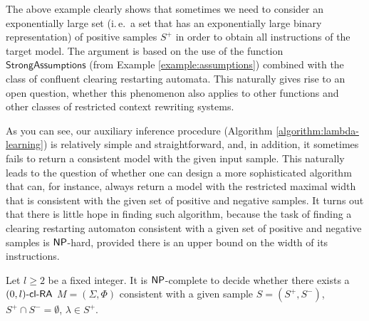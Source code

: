 The above example clearly shows that sometimes we need to consider an exponentially large set (i.\,e.\ a set that has an exponentially large binary representation) of positive samples $S^+$ in order to obtain all instructions of the target model. The argument is based on the use of the function $\mathsf{StrongAssumptions}$ (from Example \ref{example:assumptions}) combined with the class of confluent clearing restarting automata. This naturally gives rise to an open question, whether this phenomenon also applies to other functions and other classes of restricted context rewriting systems.

As you can see, our auxiliary inference procedure (Algorithm \ref{algorithm:lambda-learning}) is relatively simple and straightforward, and, in addition, it sometimes fails to return a consistent model with the given input sample. This naturally leads to the question of whether one can design a more sophisticated algorithm that can, for instance, always return a model with the restricted maximal width that is consistent with the given set of positive and negative samples. It turns out that there is little hope in finding such algorithm, because the task of finding a clearing restarting automaton consistent with a given set of positive and negative samples is $\NP$-hard, provided there is an upper bound on the width of its instructions.

\begin{theorem}[\cite{C12}]\label{theorem:0clrainference}
Let $l \ge 2$ be a fixed integer. It is $\NP$-complete to decide whether there exists a $\mbox{\sf $(0,l)$-\mbox{\sf cl-RA\/}}$ $M = (\Sigma, \Phi)$ consistent with a given sample $S = (S^+, S^-)$, $S^+ \cap S^- = \emptyset$, $\lambda \in S^+$.
\end{theorem}

